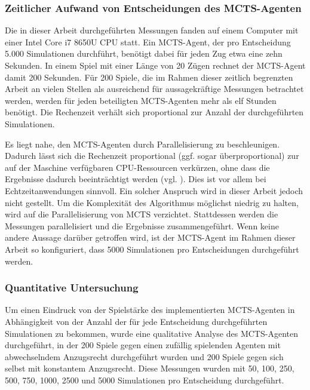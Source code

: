 \subsubsection{Zeitlicher Aufwand von Entscheidungen des MCTS-Agenten}

Die in dieser Arbeit durchgeführten Messungen fanden auf einem Computer mit einer Intel Core i7 8650U CPU statt. Ein MCTS-Agent, der pro Entscheidung 5.000 Simulationen durchführt, benötigt dabei für jeden Zug etwa eine zehn Sekunden. In einem Spiel mit einer Länge von 20 Zügen rechnet der MCTS-Agent damit 200 Sekunden. Für 200 Spiele, die im Rahmen dieser zeitlich begrenzten Arbeit an vielen Stellen als ausreichend für aussagekräftige Messungen betrachtet werden, werden für jeden beteiligten MCTS-Agenten mehr als elf Stunden benötigt. Die Rechenzeit verhält sich proportional zur Anzahl der durchgeführten Simulationen.

Es liegt nahe, den MCTS-Agenten durch Parallelisierung zu beschleunigen. Dadurch lässt sich die Rechenzeit proportional (ggf. sogar überproportional) zur auf der Maschine verfügbaren CPU-Ressourcen verkürzen, ohne dass die Ergebnisse dadurch beeinträchtigt werden (vgl. \cite{Chaslot.2008}). Dies ist vor allem bei Echtzeitanwendungen sinnvoll. Ein solcher Anspruch wird in dieser Arbeit jedoch nicht gestellt. Um die Komplexität des Algorithmus möglichst niedrig zu halten, wird auf die Parallelisierung von MCTS verzichtet. Stattdessen werden die Messungen parallelisiert und die Ergebnisse zusammengeführt. Wenn keine andere Aussage darüber getroffen wird, ist der MCTS-Agent im Rahmen dieser Arbeit so konfiguriert, dass 5000 Simulationen pro Entscheidungen durchgeführt werden.

\subsubsection{Quantitative Untersuchung}

Um einen Eindruck von der Spielstärke des implementierten MCTS-Agenten in Abhängigkeit von der Anzahl der für jede Entscheidung durchgeführten Simulationen zu bekommen, wurde eine qualitative Analyse des MCTS-Agenten durchgeführt, in der 200 Spiele gegen einen zufällig spielenden Agenten mit abwechselndem Anzugsrecht durchgeführt wurden und 200 Spiele gegen sich selbst mit konstantem Anzugsrecht. Diese Messungen wurden mit 50, 100, 250, 500, 750, 1000, 2500 und 5000 Simulationen pro Entscheidung durchgeführt.

